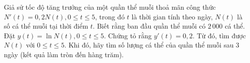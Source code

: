 \begin{bt}%
	Giả sử tốc độ tăng trưởng của một quần thể muỗi thoả mãn công thức $N'(t)=0{,}2 N(t), 0 \leq t \leq 5$, trong đó  $t$ là thời gian tính theo ngày, $N(t)$ là số cá thể muỗi tại thời điểm $t$. Biết rằng ban đầu quần thể muỗi có $2\,000$ cá thể. Đặt $y(t)=\ln N(t), 0 \leq t \leq 5$. Chứng tỏ rằng $y'(t)=0{,}2$. Từ đó, tìm được $N(t)$ với $0 \leq t \leq 5$. Khi đó, hãy tìm số lượng cá thể của quần thể muỗi sau $3$ ngày (kết quả làm tròn đến hàng trăm).
\end{bt}

